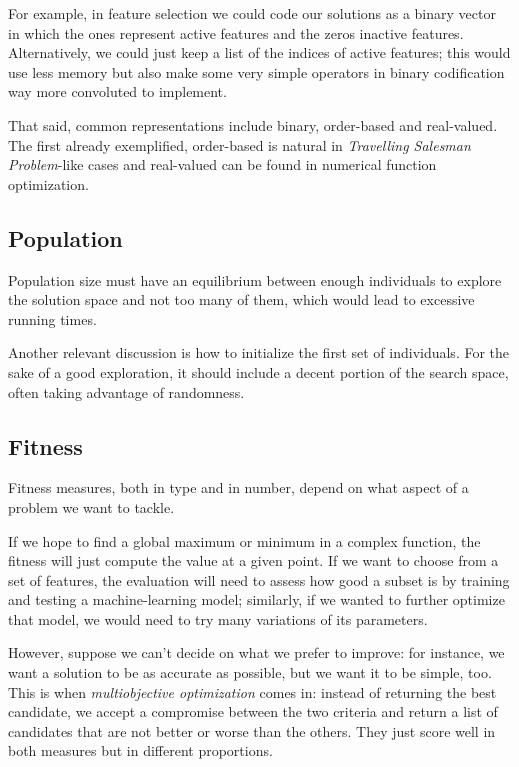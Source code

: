 		For example, in feature selection we could code our solutions as a binary vector in which the ones represent active features and the zeros inactive features. Alternatively, we could just keep a list of the indices of active features; this would use less memory but also make some very simple operators in binary codification way more convoluted to implement.

		That said, common representations include binary, order-based and real-valued. The first already exemplified, order-based is natural in \textit{Travelling Salesman Problem}-like cases and real-valued can be found in numerical function optimization.

	\subsection{Population}

		Population size must have an equilibrium between enough individuals to explore the solution space and not too many of them, which would lead to excessive running times.

		Another relevant discussion is how to initialize the first set of individuals. For the sake of a good exploration, it should include a decent portion of the search space, often taking advantage of randomness.

	\subsection{Fitness}

		Fitness measures, both in type and in number, depend on what aspect of a problem we want to tackle. 

		If we hope to find a global maximum or minimum in a complex function, the fitness will just compute the value at a given point. If we want to choose from a set of features, the evaluation will need to assess how good a subset is by training and testing a machine-learning model; similarly, if we wanted to further optimize that model, we would need to try many variations of its parameters.

		However, suppose we can't decide on what we prefer to improve: for instance, we want a solution to be as accurate as possible, but we want it to be simple, too. This is when \textit{multiobjective optimization} comes in: instead of returning the best candidate, we accept a compromise between the two criteria and return a list of candidates that are not better or worse than the others. They just score well in both measures but in different proportions.

